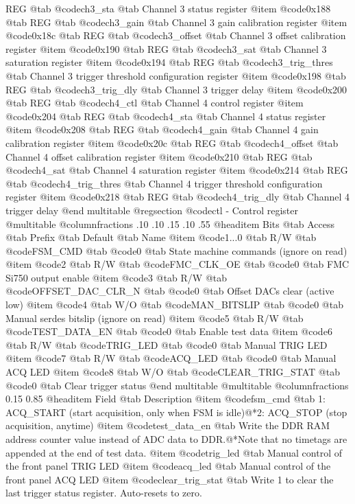 REG @tab
@code{ch3_sta} @tab
Channel 3 status register
@item @code{0x188} @tab
REG @tab
@code{ch3_gain} @tab
Channel 3 gain calibration register
@item @code{0x18c} @tab
REG @tab
@code{ch3_offset} @tab
Channel 3 offset calibration register
@item @code{0x190} @tab
REG @tab
@code{ch3_sat} @tab
Channel 3 saturation register
@item @code{0x194} @tab
REG @tab
@code{ch3_trig_thres} @tab
Channel 3 trigger threshold configuration register
@item @code{0x198} @tab
REG @tab
@code{ch3_trig_dly} @tab
Channel 3 trigger delay
@item @code{0x200} @tab
REG @tab
@code{ch4_ctl} @tab
Channel 4 control register
@item @code{0x204} @tab
REG @tab
@code{ch4_sta} @tab
Channel 4 status register
@item @code{0x208} @tab
REG @tab
@code{ch4_gain} @tab
Channel 4 gain calibration register
@item @code{0x20c} @tab
REG @tab
@code{ch4_offset} @tab
Channel 4 offset calibration register
@item @code{0x210} @tab
REG @tab
@code{ch4_sat} @tab
Channel 4 saturation register
@item @code{0x214} @tab
REG @tab
@code{ch4_trig_thres} @tab
Channel 4 trigger threshold configuration register
@item @code{0x218} @tab
REG @tab
@code{ch4_trig_dly} @tab
Channel 4 trigger delay
@end multitable 
@regsection @code{ctl} - Control register
@multitable @columnfractions .10 .10 .15 .10 .55
@headitem Bits @tab Access @tab Prefix @tab Default @tab Name
@item @code{1...0}
@tab R/W @tab
@code{FSM_CMD}
@tab @code{0} @tab 
State machine commands (ignore on read)
@item @code{2}
@tab R/W @tab
@code{FMC_CLK_OE}
@tab @code{0} @tab 
FMC Si750 output enable
@item @code{3}
@tab R/W @tab
@code{OFFSET_DAC_CLR_N}
@tab @code{0} @tab 
Offset DACs clear (active low)
@item @code{4}
@tab W/O @tab
@code{MAN_BITSLIP}
@tab @code{0} @tab 
Manual serdes bitslip (ignore on read)
@item @code{5}
@tab R/W @tab
@code{TEST_DATA_EN}
@tab @code{0} @tab 
Enable test data
@item @code{6}
@tab R/W @tab
@code{TRIG_LED}
@tab @code{0} @tab 
Manual TRIG LED
@item @code{7}
@tab R/W @tab
@code{ACQ_LED}
@tab @code{0} @tab 
Manual ACQ LED
@item @code{8}
@tab W/O @tab
@code{CLEAR_TRIG_STAT}
@tab @code{0} @tab 
Clear trigger status
@end multitable
@multitable @columnfractions 0.15 0.85
@headitem Field @tab Description
@item @code{fsm_cmd} @tab 1: ACQ_START (start acquisition, only when FSM is idle)@*2: ACQ_STOP (stop acquisition, anytime)
@item @code{test_data_en} @tab Write the DDR RAM address counter value instead of ADC data to DDR.@*Note that no timetags are appended at the end of test data.
@item @code{trig_led} @tab Manual control of the front panel TRIG LED
@item @code{acq_led} @tab Manual control of the front panel ACQ LED
@item @code{clear_trig_stat} @tab Write 1 to clear the last trigger status register. Auto-resets to zero.
